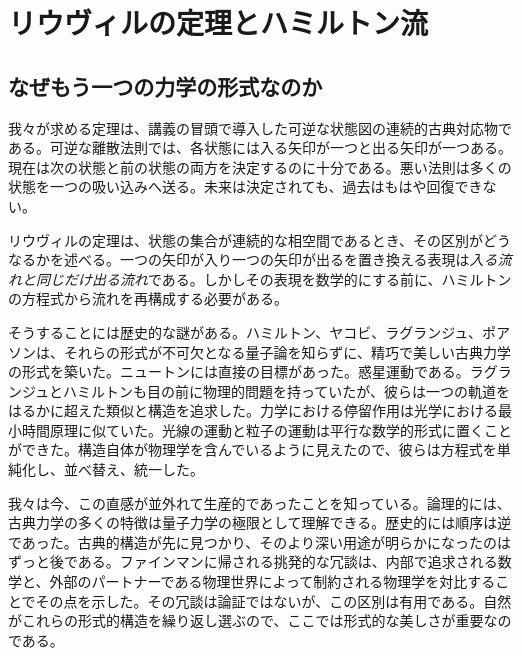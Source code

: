 \chapter{リウヴィルの定理とハミルトン流}


\section{なぜもう一つの力学の形式なのか}

我々が求める定理は、講義の冒頭で導入した可逆な状態図の連続的古典対応物である。可逆な離散法則では、各状態には入る矢印が一つと出る矢印が一つある。現在は次の状態と前の状態の両方を決定するのに十分である。悪い法則は多くの状態を一つの吸い込みへ送る。未来は決定されても、過去はもはや回復できない。

リウヴィルの定理は、状態の集合が連続的な相空間であるとき、その区別がどうなるかを述べる。一つの矢印が入り一つの矢印が出るを置き換える表現は\emph{入る流れと同じだけ出る流れ}である。しかしその表現を数学的にする前に、ハミルトンの方程式から流れを再構成する必要がある。

そうすることには歴史的な謎がある。ハミルトン、ヤコビ、ラグランジュ、ポアソンは、それらの形式が不可欠となる量子論を知らずに、精巧で美しい古典力学の形式を築いた。ニュートンには直接の目標があった。惑星運動である。ラグランジュとハミルトンも目の前に物理的問題を持っていたが、彼らは一つの軌道をはるかに超えた類似と構造を追求した。力学における停留作用は光学における最小時間原理に似ていた。光線の運動と粒子の運動は平行な数学的形式に置くことができた。構造自体が物理学を含んでいるように見えたので、彼らは方程式を単純化し、並べ替え、統一した。

我々は今、この直感が並外れて生産的であったことを知っている。論理的には、古典力学の多くの特徴は量子力学の極限として理解できる。歴史的には順序は逆であった。古典的構造が先に見つかり、そのより深い用途が明らかになったのはずっと後である。ファインマンに帰される挑発的な冗談は、内部で追求される数学と、外部のパートナーである物理世界によって制約される物理学を対比することでその点を示した。その冗談は論証ではないが、この区別は有用である。自然がこれらの形式的構造を繰り返し選ぶので、ここでは形式的な美しさが重要なのである。

